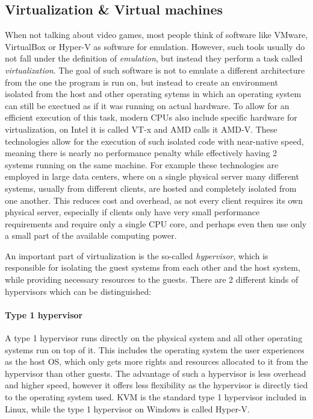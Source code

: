 \subsection{Virtualization \& Virtual machines}
When not talking about video games, most people think of software like VMware, VirtualBox or Hyper-V
as software for emulation.
However, such tools usually do not fall under the definition of \emph{emulation},
but instead they perform a task called \emph{virtualization}.
The goal of such software is not to emulate a different architecture from the one the program is run on,
but instead to create an environment isolated from the host and other operating sytems in which an operating system can still
be exectued as if it was running on actual hardware.
To allow for an efficient execution of this task, modern CPUs also include specific hardware for virtualization,
on Intel it is called VT-x and AMD calls it AMD-V.
These technologies allow for the execution of such isolated code with near-native speed,
meaning there is nearly no performance penalty while effectively having 2 systems running on the same machine.
For example these technologies are employed in large data centers,
where on a single physical server many different systems, usually from different clients,
are hosted and completely isolated from one another.
This reduces cost and overhead, as not every client requires its own physical server,
especially if clients only have very small performance requirements and require only a single CPU core,
and perhaps even then use only a small part of the available computing power.

An important part of virtualization is the so-called \emph{hypervisor},
which is responsible for isolating the guest systems from each other and the host system,
while providing necessary resources to the guests\cite{hypervisor}.
There are 2 different kinds of hypervisors which can be distinguished:

\paragraph{Type 1 hypervisor} A type 1 hypervisor runs directly on the physical system
and all other operating systems run on top of it.
This includes the operating system the user experiences as the host OS,
which only gets more rights and resources allocated to it from the hypervisor than other guests.
The advantage of such a hypervisor is less overhead and higher speed,
however it offers less flexibility as the hypervisor is directly tied to the operating system used.
KVM is the standard type 1 hypervisor included in Linux,
while the type 1 hypervisor on Windows is called Hyper-V\cite{hypervisor}.

